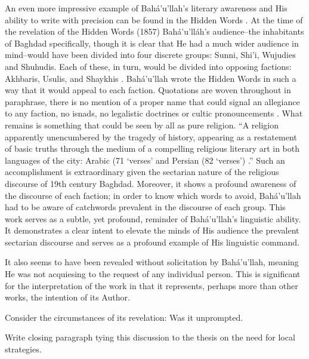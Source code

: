 \documentclass[12pt, oneside]{report}
\begin{document}
\par
An even more impressive example of Bah\'{a}'u'llah's literary awareness and His ability to write with precision can be found in the Hidden Words \cite{bahaullah_hidden_2002}. At the time of the revelation of the Hidden Words (1857) Bahá'u'lláh's audience–the inhabitants of Baghdad specifically, though it is clear that He had a much wider audience in mind–would have been divided into four discrete groups: Sunni, Shi'i, Wujudies and Shuhudis. Each of these, in turn, would be divided into opposing factions: Akhbaris, Usulis, and Shaykhis \cite{lawson_todd_globalization_2005}. Bah\'{a}'u'llah wrote the Hidden Words in such a way that it would appeal to each faction. Quotations are woven throughout in paraphrase, there is no mention of a proper name that could signal an allegiance to any faction, no isnads, no legalistic doctrines or cultic pronouncements \cite{lawson_todd_globalization_2005}. What remains is something that could be seen by all as pure religion. ``A religion apparently unencumbered by the tragedy of history, appearing as a restatement of basic truths through the medium of a compelling religious literary art in both languages of the city: Arabic (71 `verses' and Persian (82 `verses') \cite{lawson_todd_globalization_2005}.'' Such an accomplishment is extraordinary given the sectarian nature of the religious discourse of 19th century Baghdad. Moreover, it shows a profound awareness of the discourse of each faction; in order to know which words to avoid, Bah\'{a}'u'llah had to be aware of catchwords prevalent in the discourse of each group. This work serves as a subtle, yet profound, reminder of Bah\'{a}'u'llah's linguistic ability. It demonstrates a clear intent to elevate the minds of His audience the prevalent sectarian discourse and serves as a profound example of His linguistic command.
\par
It also seems to have been revealed without solicitation by Bah\'{a}'u'llah, meaning He was not acquiesing to the request of any individual person. This is significant for the interpretation of the work in that it represents, perhaps more than other works, the intention of its Author.

Consider the circumstances of its revelation: Was it unprompted.
\par
Write closing paragraph tying this discussion to the thesis on the need for local strategies.
\end{document}
